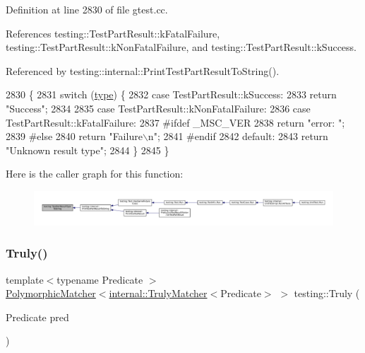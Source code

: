 Definition at line 2830 of file gtest.\+cc.



References testing\+::\+Test\+Part\+Result\+::k\+Fatal\+Failure, testing\+::\+Test\+Part\+Result\+::k\+Non\+Fatal\+Failure, and testing\+::\+Test\+Part\+Result\+::k\+Success.



Referenced by testing\+::internal\+::\+Print\+Test\+Part\+Result\+To\+String().


\begin{DoxyCode}
2830                                                                         \{
2831   \textcolor{keywordflow}{switch} (\hyperlink{namespacegenerate__debs_a50bc9a7ecac9584553e089a448bcde58}{type}) \{
2832     \textcolor{keywordflow}{case} TestPartResult::kSuccess:
2833       \textcolor{keywordflow}{return} \textcolor{stringliteral}{"Success"};
2834 
2835     \textcolor{keywordflow}{case} TestPartResult::kNonFatalFailure:
2836     \textcolor{keywordflow}{case} TestPartResult::kFatalFailure:
2837 \textcolor{preprocessor}{#ifdef \_MSC\_VER}
2838       \textcolor{keywordflow}{return} \textcolor{stringliteral}{"error: "};
2839 \textcolor{preprocessor}{#else}
2840       \textcolor{keywordflow}{return} \textcolor{stringliteral}{"Failure\(\backslash\)n"};
2841 \textcolor{preprocessor}{#endif}
2842     \textcolor{keywordflow}{default}:
2843       \textcolor{keywordflow}{return} \textcolor{stringliteral}{"Unknown result type"};
2844   \}
2845 \}
\end{DoxyCode}
Here is the caller graph for this function\+:
\nopagebreak
\begin{figure}[H]
\begin{center}
\leavevmode
\includegraphics[width=350pt]{namespacetesting_a4e9fdeef31f7e49afccfde0532f76864_icgraph}
\end{center}
\end{figure}
\mbox{\label{namespacetesting_a5faf05cfaae6074439960048e478b1c8}} 
\subsubsection{\texorpdfstring{Truly()}{Truly()}}
{\footnotesize\ttfamily template$<$typename Predicate $>$ \\
\hyperlink{classtesting_1_1PolymorphicMatcher}{Polymorphic\+Matcher}$<$\hyperlink{classtesting_1_1internal_1_1TrulyMatcher}{internal\+::\+Truly\+Matcher}$<$Predicate$>$ $>$ testing\+::\+Truly (\begin{DoxyParamCaption}\item[{Predicate}]{pred }\end{DoxyParamCaption})\hspace{0.3cm}{\ttfamily [inline]}}



